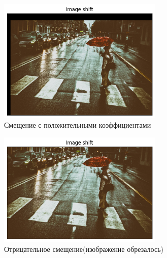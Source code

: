 \documentclass[a4paper,12pt]{article}
\begin{document}
\begin{figure}[H]
    \centering \includegraphics[width=0.7\textwidth]{my_images/5.png}
    \caption{Смещение с положительными коэффициентами}
\end{figure}
\begin{figure}[H]
    \centering \includegraphics[width=0.7\textwidth]{my_images/7.png}
    \caption{Отрицательное смещение(изображение обрезалось)}
\end{figure}
\end{document}
